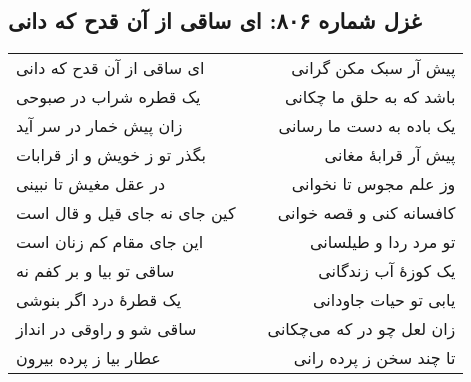 \begin{center}
\section*{غزل شماره ۸۰۶: ای ساقی از آن قدح که دانی}
\label{sec:806}
\begin{longtable}{l p{0.5cm} r}
ای ساقی از آن قدح که دانی
&&
پیش آر سبک مکن گرانی
\\
یک قطره شراب در صبوحی
&&
باشد که به حلق ما چکانی
\\
زان پیش خمار در سر آید
&&
یک باده به دست ما رسانی
\\
بگذر تو ز خویش و از قرابات
&&
پیش آر قرابهٔ مغانی
\\
در عقل مغیش تا نبینی
&&
وز علم مجوس تا نخوانی
\\
کین جای نه جای قیل و قال است
&&
کافسانه کنی و قصه خوانی
\\
این جای مقام کم زنان است
&&
تو مرد ردا و طیلسانی
\\
ساقی تو بیا و بر کفم نه
&&
یک کوزهٔ آب زندگانی
\\
یک قطرهٔ درد اگر بنوشی
&&
یابی تو حیات جاودانی
\\
ساقی شو و راوقی در انداز
&&
زان لعل چو در که می‌چکانی
\\
عطار بیا ز پرده بیرون
&&
تا چند سخن ز پرده رانی
\\
\end{longtable}
\end{center}
